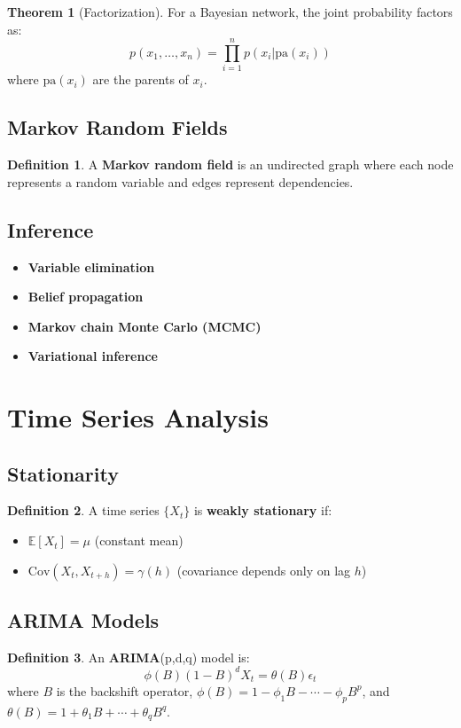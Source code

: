 \documentclass[11pt]{article}
\theoremstyle{definition}
\newtheorem{definition}{Definition}[section]
\newtheorem{theorem}{Theorem}[section]
\begin{document}
\begin{theorem}[Factorization]
For a Bayesian network, the joint probability factors as:
$$p(x_1, \ldots, x_n) = \prod_{i=1}^n p(x_i|\text{pa}(x_i))$$
where $\text{pa}(x_i)$ are the parents of $x_i$.
\end{theorem}

\subsection{Markov Random Fields}
\begin{definition}
A \textbf{Markov random field} is an undirected graph where each node represents a random variable and edges represent dependencies.
\end{definition}

\subsection{Inference}
\begin{itemize}
    \item \textbf{Variable elimination}
    \item \textbf{Belief propagation}
    \item \textbf{Markov chain Monte Carlo (MCMC)}
    \item \textbf{Variational inference}
\end{itemize}

\section{Time Series Analysis}

\subsection{Stationarity}
\begin{definition}
A time series $\{X_t\}$ is \textbf{weakly stationary} if:
\begin{itemize}
    \item $\mathbb{E}[X_t] = \mu$ (constant mean)
    \item $\text{Cov}(X_t, X_{t+h}) = \gamma(h)$ (covariance depends only on lag $h$)
\end{itemize}
\end{definition}

\subsection{ARIMA Models}
\begin{definition}
An \textbf{ARIMA}(p,d,q) model is:
$$\phi(B)(1-B)^d X_t = \theta(B) \epsilon_t$$
where $B$ is the backshift operator, $\phi(B) = 1 - \phi_1 B - \cdots - \phi_p B^p$, and $\theta(B) = 1 + \theta_1 B + \cdots + \theta_q B^q$.
\end{definition}
\end{document}
